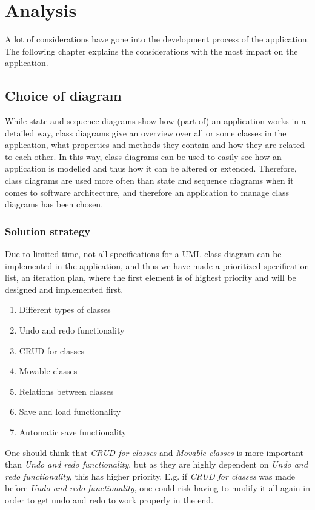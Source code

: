 \chapter{Analysis}
\label{sec:analysis}
A lot of considerations have gone into the development process of the application. The following chapter explains the considerations with the most impact on the application.

\section{Choice of diagram}
\label{sec:choice_diagram}

While state and sequence diagrams show how (part of) an application works in a detailed way, class diagrams give an overview over all or some classes in the application, what properties and methods they contain and how they are related to each other. In this way, class diagrams can be used to easily see how an application is modelled and thus how it can be altered or extended. Therefore, class diagrams are used more often than state and sequence diagrams when it comes to software architecture, and therefore an application to manage class diagrams has been chosen.

\subsection{Solution strategy}
\label{sec:sol_strat}

Due to limited time, not all specifications for a UML class diagram can be implemented in the application, and thus we have made a prioritized specification list, an iteration plan, where the first element is of highest priority and will be designed and implemented first.

\begin{enumerate}
  \item Different types of classes
  \item Undo and redo functionality
  \item CRUD for classes
  \item Movable classes
  \item Relations between classes
  \item Save and load functionality
  \item Automatic save functionality
\end{enumerate}

One should think that \textit{CRUD for classes} and \textit{Movable classes} is more important than \textit{Undo and redo functionality}, but as they are highly dependent on \textit{Undo and redo functionality}, this has higher priority. E.g. if \textit{CRUD for classes} was made before \textit{Undo and redo functionality}, one could risk having to modify it all again in order to get undo and redo to work properly in the end.

